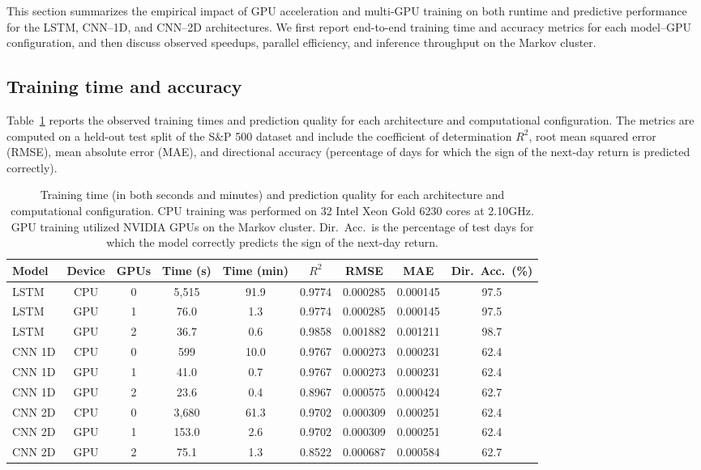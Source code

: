 \documentclass[sigconf]{acmart}
\begin{document}
This section summarizes the empirical impact of GPU acceleration and multi-GPU training on both runtime and predictive performance for the LSTM, CNN--1D, and CNN--2D architectures. We first report end-to-end training time and accuracy metrics for each model–GPU configuration, and then discuss observed speedups, parallel efficiency, and inference throughput on the Markov cluster.

\subsection{Training time and accuracy}

Table~\ref{tab:training-results} reports the observed training times and prediction quality for each architecture and computational configuration. The metrics are computed on a held-out test split of the S\&P 500 dataset and include the coefficient of determination $R^2$, root mean squared error (RMSE), mean absolute error (MAE), and directional accuracy (percentage of days for which the sign of the next-day return is predicted correctly).

\begin{table}[ht]
\centering
\small
\begin{tabular}{lcccccccc}
\toprule
Model & Device & GPUs & Time (s) & Time (min) & $R^2$ & RMSE & MAE & Dir.\ Acc.\ (\%) \\
\midrule
LSTM      & CPU & 0 & 5,515 & 91.9 & 0.9774 & 0.000285 & 0.000145 & 97.5 \\
LSTM      & GPU & 1 & 76.0  & 1.3  & 0.9774 & 0.000285 & 0.000145 & 97.5 \\
LSTM      & GPU & 2 & 36.7  & 0.6  & 0.9858 & 0.001882 & 0.001211 & 98.7 \\
CNN 1D    & CPU & 0 & 599   & 10.0 & 0.9767 & 0.000273 & 0.000231 & 62.4 \\
CNN 1D    & GPU & 1 & 41.0  & 0.7  & 0.9767 & 0.000273 & 0.000231 & 62.4 \\
CNN 1D    & GPU & 2 & 23.6  & 0.4  & 0.8967 & 0.000575 & 0.000424 & 62.7 \\
CNN 2D    & CPU & 0 & 3,680 & 61.3 & 0.9702 & 0.000309 & 0.000251 & 62.4 \\
CNN 2D    & GPU & 1 & 153.0 & 2.6  & 0.9702 & 0.000309 & 0.000251 & 62.4 \\
CNN 2D    & GPU & 2 & 75.1  & 1.3  & 0.8522 & 0.000687 & 0.000584 & 62.7 \\
\bottomrule
\end{tabular}
\caption{Training time (in both seconds and minutes) and prediction quality for each architecture and computational configuration. CPU training was performed on 32 Intel Xeon Gold 6230 cores at 2.10GHz. GPU training utilized NVIDIA GPUs on the Markov cluster. Dir.\ Acc.\ is the percentage of test days for which the model correctly predicts the sign of the next-day return.}
\label{tab:training-results}
\end{table}
\end{document}
